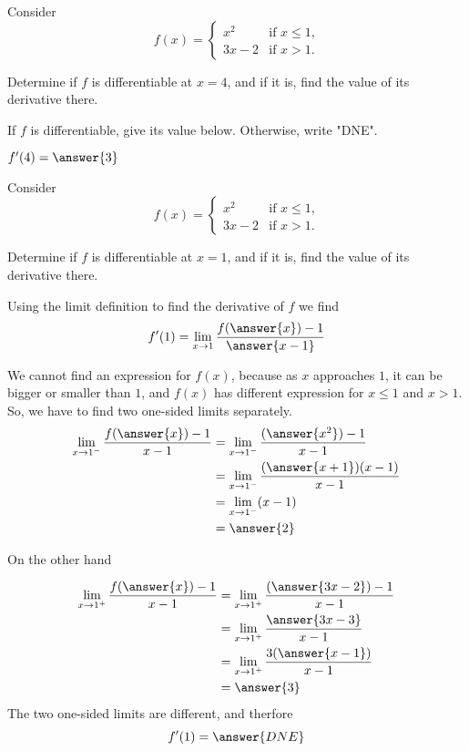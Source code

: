 \documentclass{ximera}
\author{Steven Gubkin \and Nela Lakos}
\begin{document}
\begin{exercise}

Consider 
\[
f(x) = \begin{cases} 
	x^2 &\text{if $x \leq 1$,}\\
	 3x-2 &\text{if  $x > 1$.}
\end{cases}
\]


Determine if $f$ is differentiable at $x=4$, and if it is, find the value of its derivative there.

\begin{prompt}
	If $f$ is differentiable, give its value below.  Otherwise, write "DNE".
	
	$f'(4) = \answer{3}$
\end{prompt}

\end{exercise}
\begin{exercise}

Consider 
\[
f(x) = \begin{cases} 
	x^2 &\text{if $x \leq 1$,}\\
	 3x-2 &\text{if  $x > 1$.}
\end{cases}
\]


Determine if $f$ is differentiable at $x=1$, and if it is, find the value of its derivative there.

Using the limit definition to find the derivative of $f$ we find
\[
f'(1)= \lim_{x\to1}\frac{f(\answer{x})-1}{\answer{x-1}}\\
\]

We cannot find an expression for $f(x)$, because as $x$ approaches $1$, it can be bigger or smaller than $1$, and $f(x)$ has different expression for $x\le1$ and $x>1$.
So, we have to find two one-sided limits separately.
\begin{align*}
 \lim_{x\to1^{-}}\frac{f(\answer{x})-1}{x-1}&= \lim_{x\to1^{-}}\frac{(\answer{x^2})-1}{x-1}\\
 &= \lim_{x\to1^{-}}\frac{(\answer{x+1})(x-1)}{x-1}\\
  &= \lim_{x\to1^{-}}(x-1)\\
  &=\answer{2}
       \end{align*}

On the other hand


\begin{align*}
 \lim_{x\to1^{+}}\frac{f(\answer{x})-1}{x-1}&= \lim_{x\to1^{+}}\frac{(\answer{3x-2})-1}{x-1}\\
 &=\lim_{x\to1^{+}}\frac{\answer{3x-3}}{x-1}\\
 &=\lim_{x\to1^{+}}\frac{3(\answer{x-1})}{x-1}\\
  &=\answer{3}
       \end{align*}
The two one-sided limits are different, and therfore
\[
f'(1)= {\answer{DNE}}\\
\]

\end{exercise}
\end{document}
